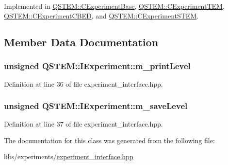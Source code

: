 Implemented in \hyperlink{class_q_s_t_e_m_1_1_c_experiment_base_a2d9b75bce6825d2539b8a0ed4b62c558}{Q\-S\-T\-E\-M\-::\-C\-Experiment\-Base}, \hyperlink{class_q_s_t_e_m_1_1_c_experiment_t_e_m_ac21a18cdcc38c7b1c85a118b94b502cd}{Q\-S\-T\-E\-M\-::\-C\-Experiment\-T\-E\-M}, \hyperlink{class_q_s_t_e_m_1_1_c_experiment_c_b_e_d_acb7adf203c7ea7f9c5a5d7f0d5094a2d}{Q\-S\-T\-E\-M\-::\-C\-Experiment\-C\-B\-E\-D}, and \hyperlink{class_q_s_t_e_m_1_1_c_experiment_s_t_e_m_abdf03000104d915ebe68bb1f81742b35}{Q\-S\-T\-E\-M\-::\-C\-Experiment\-S\-T\-E\-M}.



\subsection{Member Data Documentation}
\hypertarget{class_q_s_t_e_m_1_1_i_experiment_ae362ace9a9a7384e6159d14a7a255c69}{
\subsubsection[{m\-\_\-print\-Level}]{\setlength{\rightskip}{0pt plus 5cm}unsigned Q\-S\-T\-E\-M\-::\-I\-Experiment\-::m\-\_\-print\-Level\hspace{0.3cm}{\ttfamily [protected]}}}\label{class_q_s_t_e_m_1_1_i_experiment_ae362ace9a9a7384e6159d14a7a255c69}


Definition at line 36 of file experiment\-\_\-interface.\-hpp.

\hypertarget{class_q_s_t_e_m_1_1_i_experiment_a9f3605b834d9bcaf1bdaca1af0622182}{
\subsubsection[{m\-\_\-save\-Level}]{\setlength{\rightskip}{0pt plus 5cm}unsigned Q\-S\-T\-E\-M\-::\-I\-Experiment\-::m\-\_\-save\-Level\hspace{0.3cm}{\ttfamily [protected]}}}\label{class_q_s_t_e_m_1_1_i_experiment_a9f3605b834d9bcaf1bdaca1af0622182}


Definition at line 37 of file experiment\-\_\-interface.\-hpp.



The documentation for this class was generated from the following file\-:\begin{DoxyCompactItemize}
\item 
libs/experiments/\hyperlink{experiment__interface_8hpp}{experiment\-\_\-interface.\-hpp}\end{DoxyCompactItemize}
